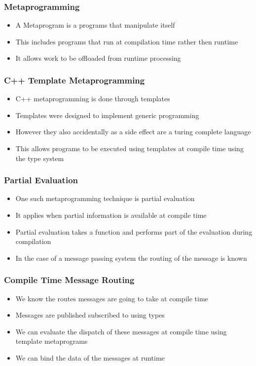 \documentclass{beamer}
\begin{document}
	\begin{frame}
		\frametitle{Metaprogramming}
		\begin{itemize}
			\item A Metaprogram is a programs that manipulate itself
			\item This includes programs that run at compilation time rather then runtime
			\item It allows work to be offloaded from runtime processing
		\end{itemize}
	\end{frame}
	
	\begin{frame}
		\frametitle{C++ Template Metaprogramming}
		\begin{itemize}
			\item C++ metaprogramming is done through templates
			\item Templates were designed to implement generic programming
			\item However they also accidentally as a side effect are a turing complete language
			\item This allows programs to be executed using templates at compile time using the type system
		\end{itemize}
	\end{frame}
		
	\begin{frame}
		\frametitle{Partial Evaluation}
		\begin{itemize}
			\item One such metaprogramming technique is partial evaluation
			\item It applies when partial information is available at compile time
			\item Partial evaluation takes a function and performs part of the evaluation during compilation
			\item In the case of a message passing system the routing of the message is known
		\end{itemize}
	\end{frame}
	
	\begin{frame}
		\frametitle{Compile Time Message Routing}
		\begin{itemize}
			\item We know the routes messages are going to take at compile time
			\item Messages are published subscribed to using types
			\item We can evaluate the dispatch of these messages at compile time using template metaprograms
			\item We can bind the data of the messages at runtime
		\end{itemize}
	\end{frame}
	
\end{document}
